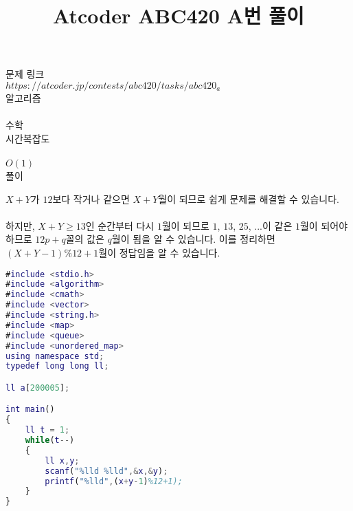 \documentclass{article}
\title{Atcoder ABC420 A번 풀이}
\begin{document}



\hypersetup{
    colorlinks=true,
    linkcolor=blue,
    filecolor=magenta,      
    urlcolor=cyan,
}

\maketitle

\noindent 문제 링크\\
\href{https://atcoder.jp/contests/abc420/tasks/abc420_a}{$https://atcoder.jp/contests/abc420/tasks/abc420_a$}\\

\noindent 알고리즘\\\\
수학\\

\noindent 시간복잡도\\\\
$O(1)$\\

\noindent 풀이

\noindent $X + Y$가 $12$보다 작거나 같으면 $X + Y$월이 되므로 쉽게 문제를 해결할 수 있습니다.\\\\
하지만, $X + Y \geq 13$인 순간부터 다시 $1$월이 되므로 $1$, $13$, $25$, $...$이 같은 $1$월이 되어야 하므로 $12p + q$꼴의 값은 $q$월이 됨을 알 수 있습니다. 이를 정리하면 $(X + Y - 1) \% 12 + 1$월이 정답임을 알 수 있습니다.\\

\lstset{style=myStyle}
\begin{lstlisting}[caption=소스코드, language=Matlab]
#include <stdio.h>
#include <algorithm>
#include <cmath>
#include <vector>
#include <string.h>
#include <map>
#include <queue>
#include <unordered_map>
using namespace std;
typedef long long ll;

ll a[200005];

int main()
{
    ll t = 1;
    while(t--)
    {
        ll x,y;
        scanf("%lld %lld",&x,&y);
        printf("%lld",(x+y-1)%12+1);
    }
}

\end{lstlisting}
\end{document}
